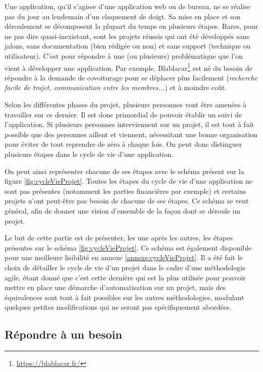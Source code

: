 Une application, qu'il s'agisse d'une application web ou de bureau, ne se réalise pas du jour au lendemain d'un claquement de doigt. Sa mise en place et son déroulement se décomposent la plupart du temps en plusieurs étapes. Rares, pour ne pas dire quasi-inexistant, sont les projets réussis qui ont été développés sans jalons, sans documentation (bien rédigée ou non) et sans support (technique ou utilisateur). C'est pour répondre à une (ou plusieurs) problématique que l'on vient à développer une application. Par exemple, Blablacar\footnote{\url{https://blablacar.fr/}} est né du besoin de répondre à la demande de covoiturage pour se déplacer plus facilement (\emph{recherche facile de trajet, communication entre les membres...}) et à moindre coût.

Selon les différentes phases du projet, plusieurs personnes vont être amenées à travailler sur ce dernier. Il est donc primordial de pouvoir établir un suivi de l'application. Si plusieurs personnes interviennent sur un projet, il est tout à fait possible que des personnes aillent et viennent, nécessitant une bonne organisation pour éviter de tout reprendre de zéro à chaque fois. On peut donc distinguer plusieurs étapes dans le cycle de vie d'une application.

On peut ainsi représenter chacune de ses étapes avec le schéma présent sur la figure \ref{fig:cycleVieProjet}. Toutes les étapes du cycle de vie d'une application ne sont pas présentes (notamment les parties financières par exemple) et certains projets n'ont peut-être pas besoin de chacune de ses étapes. Ce schéma se veut général, afin de donner une vision d'ensemble de la façon dont se déroule un projet.

Le but de cette partie est de présenter, les une après les autres, les étapes présentes sur le schéma \ref{fig:cycleVieProjet}. Ce schéma est également disponible pour une meilleure lisibilité en annexe \ref{annexe:cycleVieProjet}. Il a été fait le choix de détailler le cycle de vie d'un projet dans le cadre d'une méthodologie agile, étant donné que c'est cette dernière qui est la plus utilisée pour pouvoir mettre en place une démarche d'automatisation sur un projet, mais des équivalences sont tout à fait possibles sur les autres méthodologies, modulant quelques petites modifications qui ne seront pas spécifiquement abordées.


\subsection{Répondre à un besoin}

